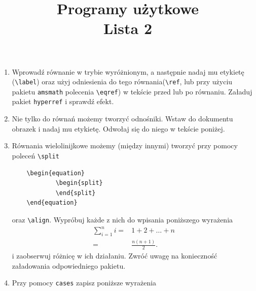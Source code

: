 \documentclass[12pt, letterpaper, fleqn, leqno]{article}
\title{Programy użytkowe \\ Lista 2}
\author{ }
\date{}
\begin{document}
\maketitle

\begin{enumerate}
    \item Wprowadź równanie w trybie wyróżnionym, a następnie nadaj mu etykietę (\verb|\label|) oraz użyj odniesienia do tego równania(\verb|\ref|, lub przy użyciu pakietu \verb|amsmath| polecenia \verb|\eqref|) w tekście przed lub po równaniu. Załaduj pakiet \verb|hyperref| i sprawdź efekt.
    \item Nie tylko do równań możemy tworzyć odnośniki. Wstaw do dokumentu obrazek i nadaj mu etykietę. Odwołaj się do niego w tekście poniżej.
    \item Równania wielolinijkowe możemy (między innymi) tworzyć przy pomocy poleceń \verb|\split|
    \begin{verbatim}
    \begin{equation}
            \begin{split}
            \end{split}
    \end{equation}
    \end{verbatim}
    oraz \verb|\align|. Wypróbuj każde z nich do wpisania poniższego wyrażenia
    \begin{align*}
       \sum_{i=1}^n i   = & 1+2+\dots+n\\
        = & \frac{n(n+1)}{2}.
    \end{align*}
    i zaobserwuj różnicę w ich działaniu. Zwróć uwagę na konieczność załadowania odpowiedniego pakietu.
    \item Przy pomocy  \verb|cases| zapisz poniższe wyrażenia
    

\end{enumerate}
\end{document}
